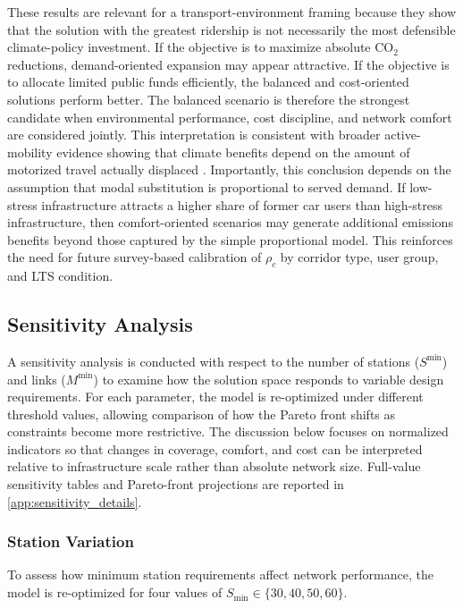 \documentclass[preprint,authoryear,10pt]{elsarticle}
\begin{document}
These results are relevant for a transport-environment framing because they show that the solution with the greatest ridership is not necessarily the most defensible climate-policy investment. If the objective is to maximize absolute CO$_2$ reductions, demand-oriented expansion may appear attractive. If the objective is to allocate limited public funds efficiently, the balanced and cost-oriented solutions perform better. The balanced scenario is therefore the strongest candidate when environmental performance, cost discipline, and network comfort are considered jointly. This interpretation is consistent with broader active-mobility evidence showing that climate benefits depend on the amount of motorized travel actually displaced \citep{BRAND2021102764, MCQUEEN2020102482}. Importantly, this conclusion depends on the assumption that modal substitution is proportional to served demand. If low-stress infrastructure attracts a higher share of former car users than high-stress infrastructure, then comfort-oriented scenarios may generate additional emissions benefits beyond those captured by the simple proportional model. This reinforces the need for future survey-based calibration of $\rho_c$ by corridor type, user group, and LTS condition.

\subsection{Sensitivity Analysis}

A sensitivity analysis is conducted with respect to the number of stations ($S^{\min}$) and links ($M^{\min}$) to examine how the solution space responds to variable design requirements. For each parameter, the model is re-optimized under different threshold values, allowing comparison of how the Pareto front shifts as constraints become more restrictive. The discussion below focuses on normalized indicators so that changes in coverage, comfort, and cost can be interpreted relative to infrastructure scale rather than absolute network size. Full-value sensitivity tables and Pareto-front projections are reported in \ref{app:sensitivity_details}.

\subsubsection{Station Variation}

To assess how minimum station requirements affect network performance, the model is re-optimized for four values of $S_{\min}\in\{30,40,50,60\}$. 
\end{document}
